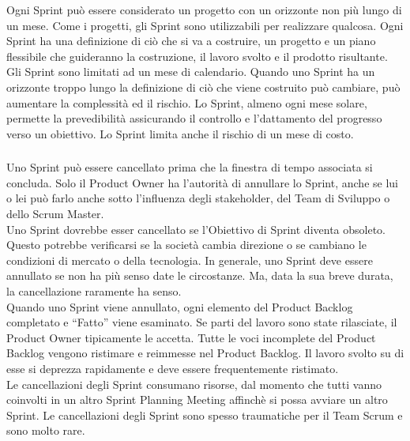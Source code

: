 Ogni Sprint pu\`o essere considerato un progetto con un orizzonte non pi\`u lungo di un mese. Come i progetti, gli Sprint sono 
utilizzabili per realizzare qualcosa. Ogni Sprint ha una definizione di ci\`o che si va a costruire, un progetto e un piano 
flessibile che guideranno la costruzione, il lavoro svolto e il prodotto risultante. \newline
\\Gli Sprint sono limitati ad un mese di calendario. Quando uno Sprint ha un orizzonte troppo lungo la definizione di ci\`o che 
viene costruito pu\`o cambiare, pu\`o aumentare la complessit\`a ed il rischio. Lo Sprint, almeno ogni mese solare, permette la 
prevedibilit\`a assicurando il controllo e l'dattamento del progresso verso un obiettivo. Lo Sprint limita anche il rischio di 
un mese di costo.

\subsubsection*{\color{SteelBlue}{Cancellare uno Sprint}}%
\label{sec:cancelling_sprint}
Uno Sprint pu\`o essere cancellato prima che la finestra di tempo associata si concluda. Solo il Product Owner ha 
l'autorit\`a di annullare lo Sprint, anche se lui o lei pu\`o farlo anche sotto l'influenza degli stakeholder, del Team di 
Sviluppo o dello Scrum Master.\newline
\\Uno Sprint dovrebbe esser cancellato se l'Obiettivo di Sprint diventa obsoleto. Questo potrebbe verificarsi se la societ\`a 
cambia direzione o se cambiano le condizioni di mercato o della tecnologia. In generale, uno Sprint deve essere annullato se 
non ha pi\`u senso date le circostanze. Ma, data la sua breve durata, la cancellazione raramente ha senso. \newline
\\Quando uno Sprint viene annullato, ogni elemento del Product Backlog completato e ``Fatto'' viene esaminato. Se parti del 
lavoro sono state rilasciate, il Product Owner tipicamente le accetta. Tutte le voci incomplete del Product Backlog vengono ristimare e 
reimmesse nel Product Backlog. Il lavoro svolto su di esse si deprezza rapidamente e deve essere frequentemente ristimato. \newline
\\Le cancellazioni degli Sprint consumano risorse, dal momento che tutti vanno coinvolti in un altro Sprint Planning 
Meeting affinch\`e si possa avviare un altro Sprint. Le cancellazioni degli Sprint sono spesso traumatiche per il Team Scrum e 
sono molto rare.


